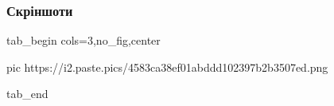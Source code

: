  
 
 
 
 

\subsubsection{Скріншоти}
\label{sec:topics.vojna.mariupol.screenshots}

\ifcmt
  tab_begin cols=3,no_fig,center

     pic https://i2.paste.pics/4583ca38ef01abddd102397b2b3507ed.png

  tab_end
\fi
